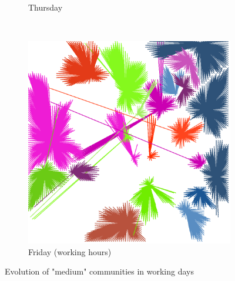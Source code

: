 \documentclass[12pt,a4paper]{article}
\begin{document}
\begin{figure}[H]
\begin{subfigure}[b]{0.48\textwidth}
\caption{Thursday}
\end{subfigure}
\\
\begin{subfigure}[b]{0.48\textwidth}
\includegraphics[width=\textwidth]{weekDef/edges-5Fri-mid.png}
\caption{Friday (working hours)}
\end{subfigure}

\caption{Evolution of "medium" communities in working days}
\end{figure}
\end{document}
